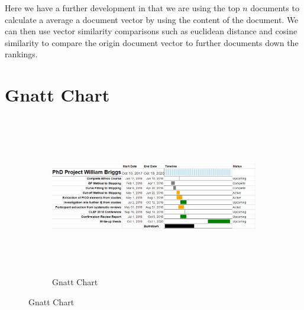 Here we have a further development in that we are using the top $n$ documents to calculate a average a document vector by using the content of the document. We can then use vector similarity comparisons such as euclidean distance and cosine similarity to compare the origin document vector to further documents down the rankings.



\section{Gnatt Chart}

\begin{figure}


\begin{figure}[H]
\center
\includegraphics[height=7cm]{figures/gnatt.png}
\caption{Gnatt Chart}
\end{figure}
\end{figure}


